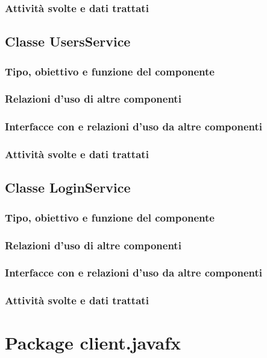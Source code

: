 \subsubsection*{Attivit\`a svolte e dati trattati}

\subsection{Classe UsersService}
\subsubsection*{Tipo, obiettivo e funzione del componente}
\subsubsection*{Relazioni d'uso di altre componenti}
\subsubsection*{Interfacce con e relazioni d'uso da altre componenti}
\subsubsection*{Attivit\`a svolte e dati trattati}

\subsection{Classe LoginService}
\subsubsection*{Tipo, obiettivo e funzione del componente}
\subsubsection*{Relazioni d'uso di altre componenti}
\subsubsection*{Interfacce con e relazioni d'uso da altre componenti}
\subsubsection*{Attivit\`a svolte e dati trattati}

\section{Package client.javafx} %
